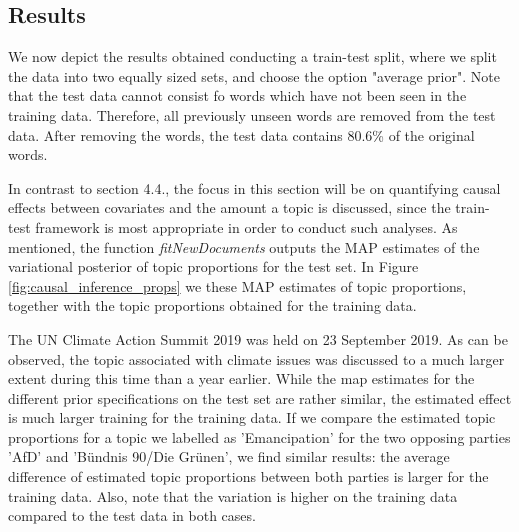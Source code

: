 \subsection{Results}

We now depict the results obtained conducting a train-test split, where we split the data into two equally sized sets, and choose the option "average prior". Note that the test data cannot consist fo words which have not been seen in the training data. Therefore, all previously unseen words are removed from the test data. After removing the words, the test data contains 80.6\% of the original words. 

In contrast to section 4.4., the focus in this section will be on quantifying causal effects between covariates and the amount a topic is discussed, since the train-test framework is most appropriate in order to conduct such analyses. As mentioned, the function \textit{fitNewDocuments} outputs the MAP estimates of the variational posterior of topic proportions for the test set. In Figure \ref{fig:causal_inference_props} we these MAP estimates of topic proportions, together with the topic proportions obtained for the training data.

The UN Climate Action Summit 2019 was held on 23 September 2019. As can be observed, the topic associated with climate issues was discussed to a much larger extent during this time than a year earlier. While the map estimates for the different prior specifications on the test set are rather similar, the estimated effect is much larger training for the training data. If we compare the estimated topic proportions for a topic we labelled as 'Emancipation' for the two opposing parties 'AfD' and 'B{\"u}ndnis 90/Die Gr{\"u}nen', we find similar results: the average difference of estimated topic proportions between both parties is larger for the training data. Also, note that the variation is higher on the training data compared to the test data in both cases.

